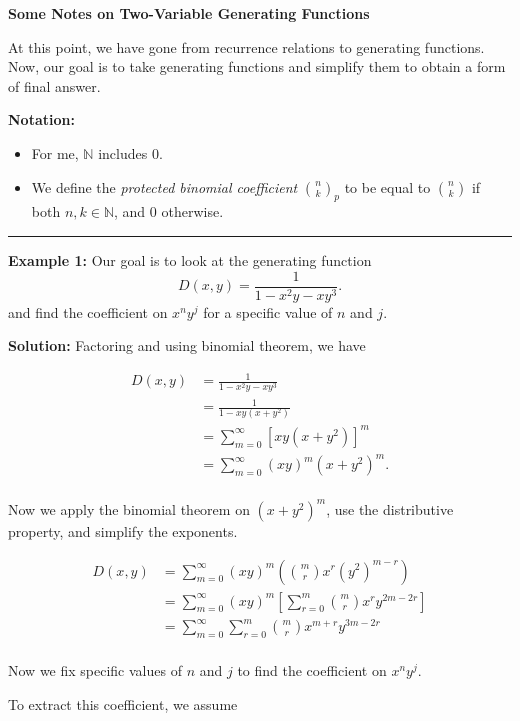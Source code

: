 \documentclass[11pt]{article}
\begin{document}
\textbf{Some Notes on Two-Variable Generating Functions}

At this point, we have gone from recurrence relations to generating functions. Now, our goal is to take generating functions and simplify them to obtain a form of final answer. 

\textbf{Notation:} 
\begin{itemize}
\item For me, $\mathbb{N}$ includes $0$.
\item We define the \textit{protected binomial coefficient} $\binom{n}{k}_p$ to be equal to $\binom{n}{k}$ if both $n, k \in \mathbb{N}$, and $0$ otherwise. 
\end{itemize}

\hrule

\textbf{Example 1:} Our goal is to look at the generating function
\[
D(x,y) = \displaystyle\frac{1}{1 - x^2y - xy^3}.
\]
and find the coefficient on $x^n y^j$ for a specific value of $n$ and $j$. 


\textbf{Solution:} Factoring and using binomial theorem, we have

\begin{align*}
D(x,y) &= \displaystyle\frac{1}{1 - x^2y - xy^3} \\
&= \displaystyle\frac{1}{1 - xy(x + y^2)} \\
&= \displaystyle\sum_{m=0}^{\infty} \left[xy(x+y^2) \right]^m \\
&= \displaystyle\sum_{m=0}^\infty (xy)^m (x+y^2)^m. \\
\end{align*}

Now we apply the binomial theorem on $(x+y^2)^m$, use the distributive property, and simplify the exponents. 

\begin{align*}
D(x,y) &= \displaystyle\sum_{m=0}^\infty (xy)^m \left( \binom{m}{r} x^r (y^2)^{m-r} \right) \\ 
&= \displaystyle\sum_{m=0}^\infty (xy)^m \left[ \displaystyle\sum_{r=0}^m \binom{m}{r} x^r y^{2m - 2r}  \right] \\
&= \displaystyle\sum_{m=0}^\infty \displaystyle\sum_{r = 0}^m \binom{m}{r} x^{m+r} y^{3m - 2r} \\ 
\end{align*}

Now we fix specific values of $n$ and $j$ to find the coefficient on $x^n y^j$. 

To extract this coefficient, we assume
\end{document}
